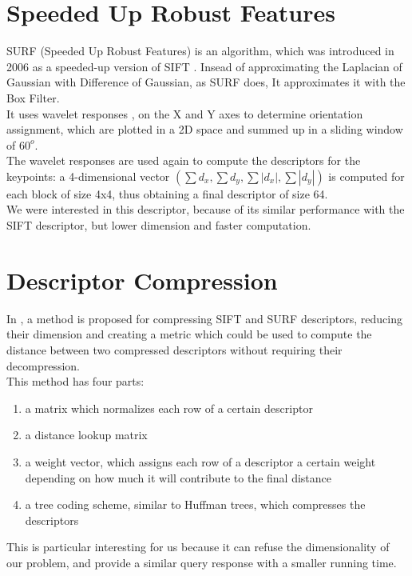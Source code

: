 \section{Speeded Up Robust Features}

SURF (Speeded Up Robust Features) is an algorithm, which was introduced in 2006 as a speeded-up version of SIFT \cite{surf}. Insead of approximating the Laplacian of Gaussian with Difference of Gaussian, as SURF does, It approximates it with the Box Filter.\\
It uses wavelet responses \cite{haarWavelet}, \cite{haarWavelet2} on the X and Y axes to determine orientation assignment, which are plotted in a 2D space and summed up in a sliding window of $60^o$.\\
The wavelet responses are used again to compute the descriptors for the keypoints: a 4-dimensional vector $(\sum{d_x}, \sum{d_y}, \sum{|d_x|}, \sum{|d_y|})$ is computed for each block of size 4x4, thus obtaining a final descriptor of size 64.\\
We were interested in this descriptor, because of its similar performance with the SIFT descriptor, but lower dimension and faster computation.\\

\section{Descriptor Compression}

In \cite{descCompression}, a method is proposed for compressing SIFT and SURF descriptors, reducing their dimension and creating a metric which could be used to compute the distance between two compressed descriptors without requiring their decompression.\\
This method has four parts:
\begin{enumerate}
	\item a matrix which normalizes each row of a certain descriptor
	\item a distance lookup matrix 
	\item a weight vector, which assigns each row of a descriptor a certain weight depending on how much it will contribute to the final distance
	\item a tree coding scheme, similar to Huffman trees, which compresses the descriptors
\end{enumerate}

This is particular interesting for us because it can refuse the dimensionality of our problem, and provide a similar query response with a smaller running time.